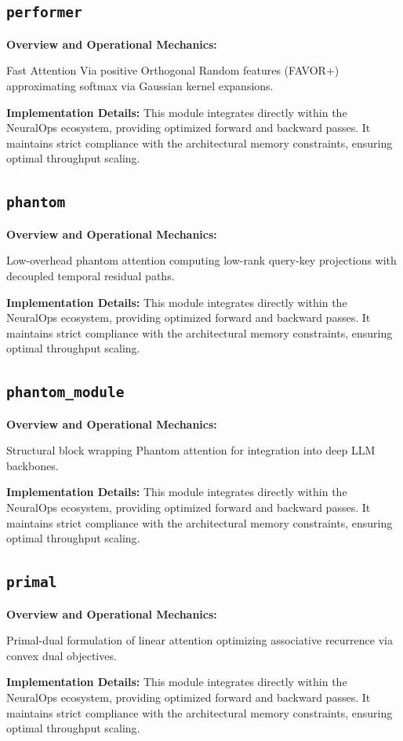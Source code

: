 \documentclass[10pt,twocolumn,letterpaper]{article}
\begin{document}
\subsection{\texttt{performer}}
\textbf{Overview and Operational Mechanics:}

Fast Attention Via positive Orthogonal Random features (FAVOR+) approximating softmax via Gaussian kernel expansions.

\textbf{Implementation Details:}
This module integrates directly within the NeuralOps ecosystem, providing optimized forward and backward passes. It maintains strict compliance with the architectural memory constraints, ensuring optimal throughput scaling.

\subsection{\texttt{phantom}}
\textbf{Overview and Operational Mechanics:}

Low-overhead phantom attention computing low-rank query-key projections with decoupled temporal residual paths.

\textbf{Implementation Details:}
This module integrates directly within the NeuralOps ecosystem, providing optimized forward and backward passes. It maintains strict compliance with the architectural memory constraints, ensuring optimal throughput scaling.

\subsection{\texttt{phantom\_module}}
\textbf{Overview and Operational Mechanics:}

Structural block wrapping Phantom attention for integration into deep LLM backbones.

\textbf{Implementation Details:}
This module integrates directly within the NeuralOps ecosystem, providing optimized forward and backward passes. It maintains strict compliance with the architectural memory constraints, ensuring optimal throughput scaling.

\subsection{\texttt{primal}}
\textbf{Overview and Operational Mechanics:}

Primal-dual formulation of linear attention optimizing associative recurrence via convex dual objectives.

\textbf{Implementation Details:}
This module integrates directly within the NeuralOps ecosystem, providing optimized forward and backward passes. It maintains strict compliance with the architectural memory constraints, ensuring optimal throughput scaling.
\end{document}
